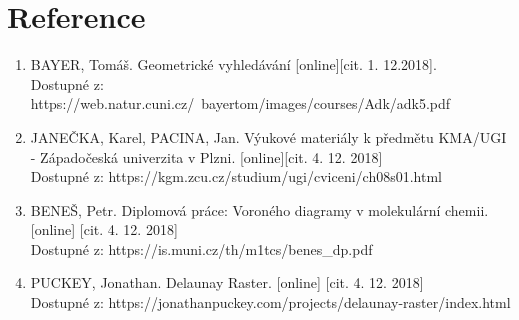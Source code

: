 \documentclass[a4paper, 12pt]{article}
\begin{document}
\clearpage
\section{Reference}

\begin{enumerate}
\item  BAYER, Tomáš. Geometrické vyhledávání [online][cit. 1. 12.2018]. \\
Dostupné z: https://web.natur.cuni.cz/~bayertom/images/courses/Adk/adk5.pdf  \\

\item JANEČKA, Karel, PACINA, Jan. Výukové materiály k předmětu KMA/UGI - Západočeská univerzita v Plzni. [online][cit. 4. 12. 2018]\\
Dostupné z: https://kgm.zcu.cz/studium/ugi/cviceni/ch08s01.html\\

\item BENEŠ, Petr. Diplomová práce: Voroného diagramy v molekulární chemii. [online] [cit. 4. 12. 2018]\\
Dostupné z: https://is.muni.cz/th/m1tcs/benes\_dp.pdf \\

\item PUCKEY, Jonathan. Delaunay Raster. [online] [cit. 4. 12. 2018]\\
Dostupné z: https://jonathanpuckey.com/projects/delaunay-raster/index.html





\end{enumerate}
\end{document}
